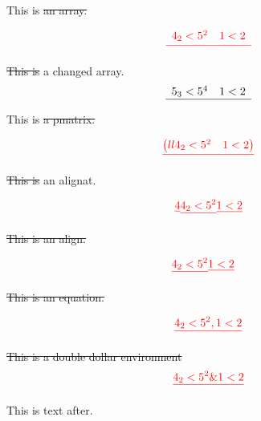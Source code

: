 \documentclass{article}
\providecommand{\DIFdel}[1]{{\protect\color{red}\sout{#1}}}                      %
\providecommand{\DIFaddbegin}{} %
\providecommand{\DIFaddend}{} %
\providecommand{\DIFdelbegin}{} %
\providecommand{\DIFdelend}{} %
\begin{document}
This is \DIFdelbegin \DIFdel{an array.
}%

\[
\DIFdel{\begin{array}{ll}
 4_2  < 5^2 & 1 < 2 \\
\end{array}
}\]

\DIFdel{This is }\DIFdelend a changed array.
\[
\DIFdelbegin %
\DIFdelend \DIFaddbegin \begin{array}{ll}
 5_3  < 5^4 & 1 < 2 \\\hline
\end{array}
\DIFaddend \]

This is \DIFdelbegin \DIFdel{a pmatrix.
}%

\[
\DIFdel{\begin{pmatrix}{ll}
 4_2  < 5^2 & 1 < 2 \\
\end{pmatrix}
}\]

\DIFdel{This is }\DIFdelend an alignat.
\DIFdelbegin %

\begin{align*}{\DIFdel{4}}
 \DIFdel{4_2  < 5^2 }& \DIFdel{1 < 2 }\\
\end{align*}

\DIFdel{This is an align.
}%

\begin{align*}
 \DIFdel{4_2  < 5^2 }& \DIFdel{1 < 2 
}\end{align*}

\DIFdel{This is an equation.
}%

\begin{displaymath}
 \DIFdel{4_2  < 5^2 , 1 < 2 }\\
\end{displaymath}

\DIFdel{This is a double dollar environment
}\begin{displaymath}
 \DIFdel{4_2  < 5^2 \& 1 < 2 
}\end{displaymath}
\DIFdelend 

This is text after.
\end{document}
